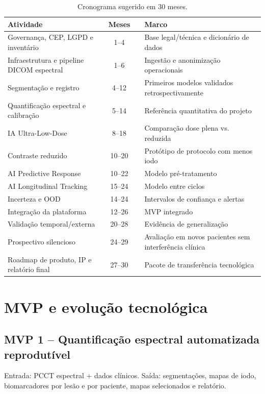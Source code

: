 \documentclass[11pt,a4paper]{article}
\begin{document}
\begin{table}[htbp]
\centering
\caption{Cronograma sugerido em 30 meses.}
\begin{tabular}{p{5.6cm}cc p{5.4cm}}
\toprule
\textbf{Atividade} & \textbf{Meses} & & \textbf{Marco}\\
\midrule
Governança, CEP, LGPD e inventário & 1--4 & & Base legal/técnica e dicionário de dados\\
Infraestrutura e pipeline DICOM espectral & 1--6 & & Ingestão e anonimização operacionais\\
Segmentação e registro & 4--12 & & Primeiros modelos validados retrospectivamente\\
Quantificação espectral e calibração & 5--14 & & Referência quantitativa do projeto\\
IA Ultra-Low-Dose & 8--18 & & Comparação dose plena vs. reduzida\\
Contraste reduzido & 10--20 & & Protótipo de protocolo com menos iodo\\
AI Predictive Response & 10--22 & & Modelo pré-tratamento\\
AI Longitudinal Tracking & 15--24 & & Modelo entre ciclos\\
Incerteza e OOD & 14--24 & & Intervalos de confiança e alertas\\
Integração da plataforma & 12--26 & & MVP integrado\\
Validação temporal/externa & 20--28 & & Evidência de generalização\\
Prospectivo silencioso & 24--29 & & Avaliação em novos pacientes sem interferência clínica\\
Roadmap de produto, IP e relatório final & 27--30 & & Pacote de transferência tecnológica\\
\bottomrule
\end{tabular}
\end{table}

\section{MVP e evolução tecnológica}

\subsection{MVP 1 -- Quantificação espectral automatizada reprodutível}
Entrada: PCCT espectral + dados clínicos. Saída: segmentações, mapas de iodo, biomarcadores por lesão e por paciente, mapas selecionados e relatório.
\end{document}
